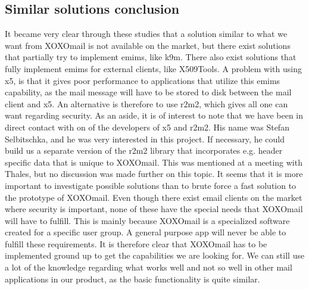 \subsection{Similar solutions conclusion}
It became very clear through these studies that a solution similar to what we want from XOXOmail is not available on the market, but there exist solutions that partially try to implement \gls{emims}, like \gls{k9m}. There also exist solutions that fully implement \gls{emims} for external clients, like X509Tools. A problem with using \gls{x5}, is that it gives poor performance to applications that utilize this \gls{emims} capability, as the mail message will have to be stored to disk between the mail client and \gls{x5}. An alternative is therefore to use \gls{r2m2}, which gives all one can want regarding security.
\newline
\newline
As an aside, it is of interest to note that we have been in direct contact with on of the developers of \gls{x5} and \gls{r2m2}. His name was Stefan Selbitschka, and he was very interested in this project. If necessary, he could build us a separate version of the \gls{r2m2} library that incorporates e.g. header specific data that is unique to XOXOmail. This was mentioned at a meeting with Thales, but no discussion was made further on this topic. It seems that it is more important to investigate possible solutions than to brute force a fast solution to the prototype of XOXOmail.
\newline
\newline
Even though there exist email clients on the market where security is important, none of these have the special needs that XOXOmail will have to fulfill. This is mainly because XOXOmail is a specialized software created for a specific user group. A general purpose app will never be able to fulfill these requirements. It is therefore clear that XOXOmail has to be implemented ground up to get the capabilities we are looking for. We can still use a lot of the knowledge regarding what works well and not so well in other mail applications in our product, as the basic functionality is quite similar.

